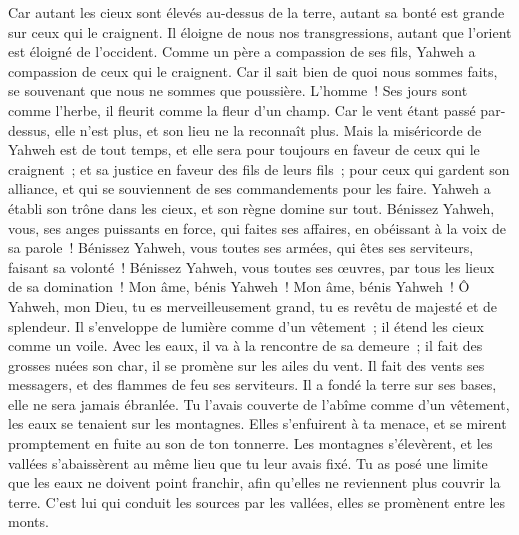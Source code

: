 \begin{multicols}{2}
Car autant les cieux sont élevés au-dessus de la terre, autant sa bonté est grande sur ceux qui le craignent.
Il éloigne de nous nos transgressions, autant que l'orient est éloigné de l'occident.
Comme un père a compassion de ses fils, Yahweh a compassion de ceux qui le craignent.
Car il sait bien de quoi nous sommes faits, se souvenant que nous ne sommes que poussière.
L'homme~! Ses jours sont comme l'herbe, il fleurit comme la fleur d'un champ.
Car le vent étant passé par-dessus, elle n'est plus, et son lieu ne la reconnaît plus.
Mais la miséricorde de Yahweh est de tout temps, et elle sera pour toujours en faveur de ceux qui le craignent~; et sa justice en faveur des fils de leurs fils~;
pour ceux qui gardent son alliance, et qui se souviennent de ses commandements pour les faire.
Yahweh a établi son trône dans les cieux, et son règne domine sur tout.
Bénissez Yahweh, vous, ses anges puissants en force, qui faites ses affaires, en obéissant à la voix de sa parole~!
Bénissez Yahweh, vous toutes ses armées, qui êtes ses serviteurs, faisant sa volonté~!
Bénissez Yahweh, vous toutes ses œuvres, par tous les lieux de sa domination~! Mon âme, bénis Yahweh~!
\VerseOne{}Mon âme, bénis Yahweh~! Ô Yahweh, mon Dieu, tu es merveilleusement grand, tu es revêtu de majesté et de splendeur.
Il s'enveloppe de lumière comme d'un vêtement~; il étend les cieux comme un voile.
Avec les eaux, il va à la rencontre de sa demeure~; il fait des grosses nuées son char, il se promène sur les ailes du vent.
Il fait des vents ses messagers, et des flammes de feu ses serviteurs.
Il a fondé la terre sur ses bases, elle ne sera jamais ébranlée.
Tu l'avais couverte de l'abîme comme d'un vêtement, les eaux se tenaient sur les montagnes.
Elles s'enfuirent à ta menace, et se mirent promptement en fuite au son de ton tonnerre.
Les montagnes s'élevèrent, et les vallées s'abaissèrent au même lieu que tu leur avais fixé.
Tu as posé une limite que les eaux ne doivent point franchir, afin qu'elles ne reviennent plus couvrir la terre.
C'est lui qui conduit les sources par les vallées, elles se promènent entre les monts.

\end{multicols}
